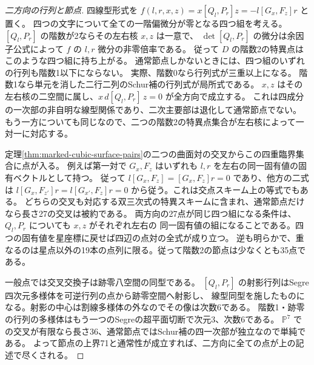 \begin{proof}[二方向の行列と節点]
四線型形式を $f(l,r,x,z)=x[Q_l,P_r]z=-l[G_x,F_z]r$ と置く。
四つの文字について全ての一階偏微分が零となる四つ組を考える。
$[Q_l,P_r]$ の階数が2ならその左右核 $x,z$ は一意で、
$\det[Q_l,P_r]$ の微分は余因子公式によって $f$ の $l,r$ 微分の非零倍率である。
従って $D$ の階数2の特異点はこのような四つ組に持ち上がる。
通常節点しかないときには、四つ組のいずれの行列も階数1以下にならない。
実際、階数0なら行列式が三重以上になる。
階数1なら単元を消した二行二列のSchur補の行列式が局所式である。
$x,z$ はその左右核の二空間に属し、$x\,d[Q_l,P_r]\,z=0$ が全方向で成立する。
これは四成分の一次部の非自明な線型関係であり、二次主要部は退化して通常節点でない。
もう一方についても同じなので、二つの階数2の特異点集合が左右核によって一対一に対応する。

定理\ref{thm:marked-cubic-surface-pairs}の二つの曲面対の交叉からこの四重臨界集合に点が入る。
例えば第一対で $G_x,F_z$ はいずれも $l,r$ を左右の同一固有値の固有ベクトルとして持つ。
従って $l[G_x,F_z]=[G_x,F_z]r=0$ であり、他方の二式は
$l[G_x,F_{z'}]r=l[G_{x'},F_z]r=0$ から従う。これは交点スキーム上の等式でもある。
どちらの交叉も対応する双三次式の特異スキームに含まれ、通常節点だけなら長さ27の交叉は被約である。
両方向の27点が同じ四つ組になる条件は、$Q_l,P_r$ についても $x,z$ がそれぞれ左右の
同一固有値の組になることである。四つの固有値を星座標に戻せば四辺の点対の全式が成り立つ。
逆も明らかで、重なるのは星点以外の19本の点列に限る。従って階数2の節点は少なくとも35点である。

一般点では交叉交換子は跡零八空間の同型である。
$[Q_l,P_r]$ の射影行列はSegre四次元多様体を可逆行列の点から跡零空間へ射影し、
線型同型を施したものになる。射影の中心は割線多様体の外なのでその像は次数6である。
階数1・跡零の行列の多様体はもう一つのSegreの超平面切断で次元3、次数6である。
$\mathbb P^7$ での交叉が有限なら長さ36、通常節点ではSchur補の四一次部が独立なので単純である。
よって節点の上界71と通常性が成立すれば、二方向に全ての点が上の記述で尽くされる。
\end{proof}

